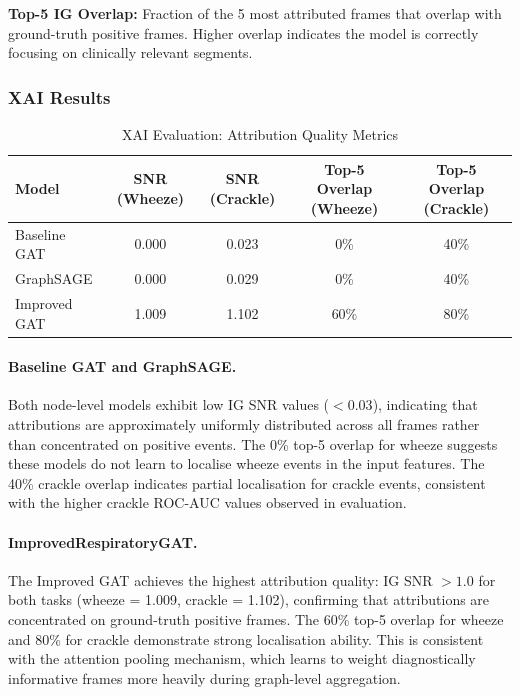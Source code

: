 \textbf{Top-5 IG Overlap:} Fraction of the 5 most attributed frames
that overlap with ground-truth positive frames. Higher overlap indicates
the model is correctly focusing on clinically relevant segments.

\subsubsection{XAI Results}

\begin{table}[!h]
  \renewcommand{\arraystretch}{1.15}
  \caption{XAI Evaluation: Attribution Quality Metrics}
  \label{tab:xai_results}
  \centering
  \begin{tabular}{@{}lcccc@{}}
    \toprule
    \textbf{Model}
      & \textbf{SNR (Wheeze)}
      & \textbf{SNR (Crackle)}
      & \textbf{Top-5 Overlap (Wheeze)}
      & \textbf{Top-5 Overlap (Crackle)} \\
    \midrule
    Baseline GAT   & 0.000 & 0.023 & 0\%  & 40\% \\
    GraphSAGE      & 0.000 & 0.029 & 0\%  & 40\% \\
    Improved GAT   & 1.009 & 1.102 & 60\% & 80\% \\
    \bottomrule
  \end{tabular}
\end{table}

\paragraph{Baseline GAT and GraphSAGE.}
Both node-level models exhibit low IG SNR values ($< 0.03$), indicating
that attributions are approximately uniformly distributed across all
frames rather than concentrated on positive events. The 0\% top-5 overlap
for wheeze suggests these models do not learn to localise wheeze events
in the input features. The 40\% crackle overlap indicates partial
localisation for crackle events, consistent with the higher crackle
ROC-AUC values observed in evaluation.

\paragraph{ImprovedRespiratoryGAT.}
The Improved GAT achieves the highest attribution quality: IG SNR $> 1.0$
for both tasks (wheeze = 1.009, crackle = 1.102), confirming that
attributions are concentrated on ground-truth positive frames. The 60\%
top-5 overlap for wheeze and 80\% for crackle demonstrate strong
localisation ability. This is consistent with the attention pooling
mechanism, which learns to weight diagnostically informative frames more
heavily during graph-level aggregation.

